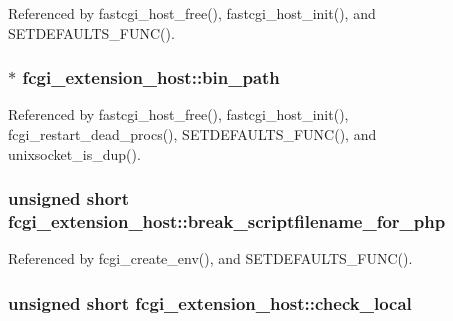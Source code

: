Referenced by fastcgi\-\_\-host\-\_\-free(), fastcgi\-\_\-host\-\_\-init(), and S\-E\-T\-D\-E\-F\-A\-U\-L\-T\-S\-\_\-\-F\-U\-N\-C().

\hypertarget{structfcgi__extension__host_aafa7f5935af4080ec15eb2293b804db9}{
\subsubsection[{bin\-\_\-path}]{$\ast$ fcgi\-\_\-extension\-\_\-host\-::bin\-\_\-path}}\label{structfcgi__extension__host_aafa7f5935af4080ec15eb2293b804db9}


Referenced by fastcgi\-\_\-host\-\_\-free(), fastcgi\-\_\-host\-\_\-init(), fcgi\-\_\-restart\-\_\-dead\-\_\-procs(), S\-E\-T\-D\-E\-F\-A\-U\-L\-T\-S\-\_\-\-F\-U\-N\-C(), and unixsocket\-\_\-is\-\_\-dup().

\hypertarget{structfcgi__extension__host_ada771e3cb76cc3269daf3ce9eded13af}{
\subsubsection[{break\-\_\-scriptfilename\-\_\-for\-\_\-php}]{\setlength{\rightskip}{0pt plus 5cm}unsigned short fcgi\-\_\-extension\-\_\-host\-::break\-\_\-scriptfilename\-\_\-for\-\_\-php}}\label{structfcgi__extension__host_ada771e3cb76cc3269daf3ce9eded13af}


Referenced by fcgi\-\_\-create\-\_\-env(), and S\-E\-T\-D\-E\-F\-A\-U\-L\-T\-S\-\_\-\-F\-U\-N\-C().

\hypertarget{structfcgi__extension__host_ae56011c0dbe54673fe797233984514b5}{
\subsubsection[{check\-\_\-local}]{\setlength{\rightskip}{0pt plus 5cm}unsigned short fcgi\-\_\-extension\-\_\-host\-::check\-\_\-local}}\label{structfcgi__extension__host_ae56011c0dbe54673fe797233984514b5}



